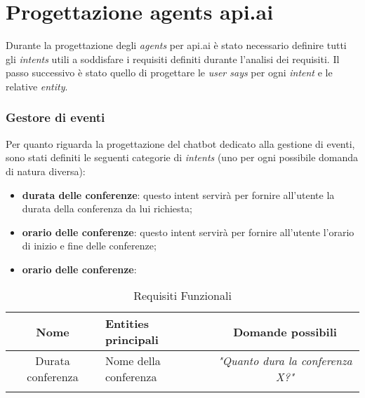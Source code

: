 \section{Progettazione agents api.ai}
Durante la progettazione degli \emph{agents} per api.ai è stato necessario definire tutti gli \emph{intents} utili a soddisfare i requisiti definiti durante l'analisi dei requisiti. Il passo successivo è stato quello di progettare le \emph{user says} per ogni \emph{intent} e le relative \emph{entity}.

\subsubsection{Gestore di eventi}
Per quanto riguarda la progettazione del \gls{chatbot} dedicato alla gestione di eventi, sono stati definiti le seguenti categorie di \emph{intents} (uno per ogni possibile domanda di natura diversa):
\begin{itemize}
	\item \textbf{durata delle conferenze}: questo intent servirà per fornire all'utente la durata della conferenza da lui richiesta;
	\item \textbf{orario delle conferenze}: questo intent servirà per fornire all'utente l'orario di inizio e fine delle conferenze;
	\item \textbf{orario delle conferenze}: 
\end{itemize}

\begin{center}
\begin{longtable}{|c|>{\centering}m{7cm}|c|}
\hline
\textbf{Nome} & \textbf{Entities principali} & \textbf{Domande possibili}\\
\hline
\endhead
Durata conferenza &  Nome della conferenza & \emph{"Quanto dura la conferenza X?"}\\ \hline
\caption[Requisiti Funzionali]{Requisiti Funzionali}
\label{tabella:req0}
\end{longtable}
\end{center}



